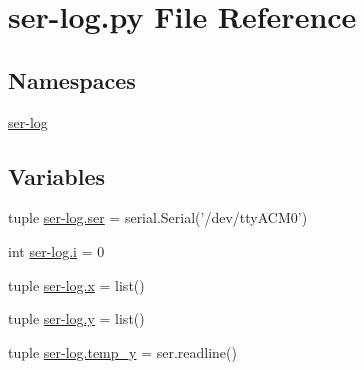\hypertarget{ser-log_8py}{\section{ser-\/log.py File Reference}
\label{ser-log_8py}
}
\subsection*{Namespaces}
\begin{DoxyCompactItemize}
\item 
\hyperlink{namespaceser-log}{ser-\/log}
\end{DoxyCompactItemize}
\subsection*{Variables}
\begin{DoxyCompactItemize}
\item 
tuple \hyperlink{namespaceser-log_ae5e2c2855fe8c235874474c5277745ac}{ser-\/log.\-ser} = serial.\-Serial('/dev/tty\-A\-C\-M0')
\item 
int \hyperlink{namespaceser-log_a07a12eb5896dee0953b2f34bf4e3e0d8}{ser-\/log.\-i} = 0
\item 
tuple \hyperlink{namespaceser-log_ad4c918427408ee85c0def9ccf3a8cdaa}{ser-\/log.\-x} = list()
\item 
tuple \hyperlink{namespaceser-log_a6381ab980f595f0e94c91312cc3020c5}{ser-\/log.\-y} = list()
\item 
tuple \hyperlink{namespaceser-log_af746ba3a68039d15d0a46e905dc990d2}{ser-\/log.\-temp\-\_\-y} = ser.\-readline()
\end{DoxyCompactItemize}
